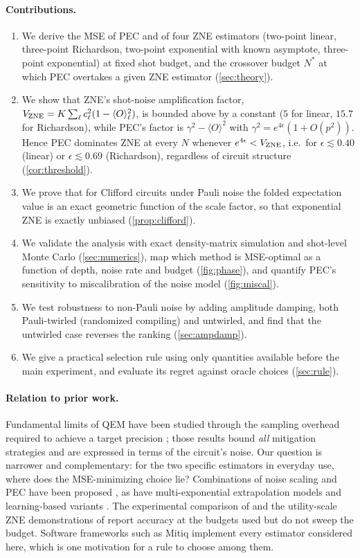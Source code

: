\documentclass[aps,pra,reprint,amsmath,amssymb,nofootinbib,superscriptaddress]{revtex4-2}
\theoremstyle{remark}
\newcommand{\eps}{\epsilon}
\begin{document}
\paragraph{Contributions.}
\begin{enumerate}
\item We derive the MSE of PEC and of four ZNE estimators (two-point linear, three-point Richardson, two-point exponential with known asymptote, three-point exponential) at fixed shot budget, and the crossover budget $N^*$ at which PEC overtakes a given ZNE estimator (\cref{sec:theory}).
\item We show that ZNE's shot-noise amplification factor, $V_{\rm ZNE}=K\sum_\ell c_\ell^2(1-\langle O\rangle_\ell^2)$, is bounded above by a constant ($5$ for linear, $15.7$ for Richardson), while PEC's factor is $\gamma^2-\langle O\rangle^2$ with $\gamma^2 = e^{4\eps}(1+O(p^2))$. Hence PEC dominates ZNE at every $N$ whenever $e^{4\eps}<V_{\rm ZNE}$, i.e.\ for $\eps\lesssim0.40$ (linear) or $\eps\lesssim0.69$ (Richardson), regardless of circuit structure (\cref{cor:threshold}).
\item We prove that for Clifford circuits under Pauli noise the folded expectation value is an exact geometric function of the scale factor, so that exponential ZNE is exactly unbiased (\cref{prop:clifford}).
\item We validate the analysis with exact density-matrix simulation and shot-level Monte Carlo (\cref{sec:numerics}), map which method is MSE-optimal as a function of depth, noise rate and budget (\cref{fig:phase}), and quantify PEC's sensitivity to miscalibration of the noise model (\cref{fig:miscal}).
\item We test robustness to non-Pauli noise by adding amplitude damping, both Pauli-twirled (randomized compiling) and untwirled, and find that the untwirled case reverses the ranking (\cref{sec:ampdamp}).
\item We give a practical selection rule using only quantities available before the main experiment, and evaluate its regret against oracle choices (\cref{sec:rule}).
\end{enumerate}

\paragraph{Relation to prior work.}
Fundamental limits of QEM have been studied through the sampling overhead required to achieve a target precision \cite{takagi2022,quek2022,tsubouchi2023}; those results bound \emph{all} mitigation strategies and are expressed in terms of the circuit's noise. Our question is narrower and complementary: for the two specific estimators in everyday use, where does the MSE-minimizing choice lie? Combinations of noise scaling and PEC have been proposed \cite{mari2021}, as have multi-exponential extrapolation models \cite{cai2021} and learning-based variants \cite{strikis2021,lowe2021}. The experimental comparison of \citet{vandenberg2023} and the utility-scale ZNE demonstrations of \citet{kim2023} report accuracy at the budgets used but do not sweep the budget. Software frameworks such as Mitiq \cite{larose2022} implement every estimator considered here, which is one motivation for a rule to choose among them.
\end{document}
